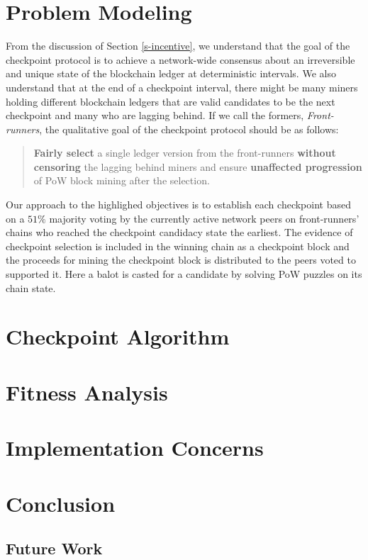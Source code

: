 \documentclass[conference]{IEEEtran}
\begin{document}


    

\section{Problem Modeling}
\label{s-model}
From the discussion of Section \ref{s-incentive}, we understand that the goal of the checkpoint protocol is to achieve a network-wide consensus about an irreversible and unique state of the blockchain ledger at deterministic intervals. We also understand that at the end of a checkpoint interval, there might be many miners holding different blockchain ledgers that are valid candidates to be the next checkpoint and many who are lagging behind. If we call the formers, \textit{Front-runners}, the qualitative goal of the checkpoint protocol should be as follows:

\begin{quote}
\textbf{Fairly select} a single ledger version from the front-runners \textbf{without censoring} the lagging behind miners and ensure \textbf{unaffected progression} of PoW block mining after the selection.  
\end{quote}

Our approach to the highlighed objectives is to establish each checkpoint based on a $51\%$ majority voting by the currently active network peers on front-runners' chains who reached the checkpoint candidacy state the earliest. The evidence of checkpoint selection is included in the winning chain as a checkpoint block and the proceeds for mining the checkpoint block is distributed to the peers voted to supported it. Here a balot is casted for a candidate by solving PoW puzzles on its chain state. 

  

\section{Checkpoint Algorithm}
\label{s-algorithm}

\section{Fitness Analysis}
\label{s-analysis}

\section{Implementation Concerns}
\label{s-implementation}

\section{Conclusion}
\label{s-conclusion}
\subsection{Future Work}
 


\end{document}

